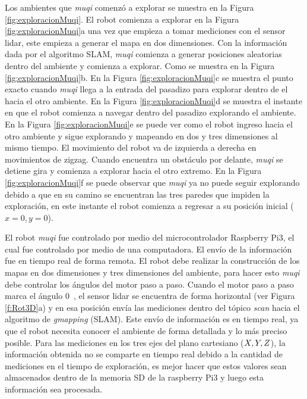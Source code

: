 Los ambientes que \textit{muqi} comenzó a explorar se muestra en la Figura 
\ref{fig:exploracionMuqi}. El robot comienza a explorar en la Figura 
\ref{fig:exploracionMuqi}a una vez que empieza a tomar mediciones con el sensor 
lidar, este empieza a generar el mapa en dos dimensiones. Con la información
dada por el algoritmo SLAM, \textit{muqi} comienza a generar posiciones aleatorias 
dentro del ambiente y comienza a explorar. Como se muestra en la Figura 
\ref{fig:exploracionMuqi}b. En la Figura \ref{fig:exploracionMuqi}c se muestra el 
punto exacto cuando \textit{muqi} llega a la entrada del pasadizo para explorar 
dentro de el hacia el otro ambiente. En la Figura \ref{fig:exploracionMuqi}d se 
muestra el instante en que el robot comienza a navegar dentro del pasadizo explorando 
el ambiente. En la Figura \ref{fig:exploracionMuqi}e se puede ver como el robot ingreso 
hacia el otro ambiente y sigue explorando y mapeando en dos y tres dimensiones al 
mismo tiempo. El movimiento del robot va de izquierda a derecha en movimientos de 
zigzag. Cuando encuentra un obstáculo por delante, \textit{muqi} se detiene gira y 
comienza a explorar hacia el otro extremo. En la Figura \ref{fig:exploracionMuqi}f 
se puede observar que \textit{muqi} ya no puede seguir explorando debido a que en 
su camino se encuentran las tres paredes que impiden la exploración, en este 
instante el robot comienza a regresar a su posición inicial ($x = 0, y = 0$).

El robot \textit{muqi} fue controlado por medio del microcontrolador Raspberry Pi3, el 
cual fue controlado por medio de una computadora. El envío de la información fue en 
tiempo real de forma remota. El robot debe realizar la construcción de los mapas en 
dos dimensiones y tres dimensiones del ambiente, para hacer esto \textit{muqi} debe 
controlar los ángulos del motor paso a paso. Cuando el motor paso a paso marca el 
ángulo 0~\grad, el sensor lidar se encuentra de forma horizontal (ver Figura \ref{f:Rot3D}a) 
y en esa posición envía las mediciones dentro del tópico \textit{scan} hacia el 
algoritmo de \textit{gmapping} (SLAM). Este envío de información es en tiempo real, ya 
que el robot necesita conocer el ambiente de forma detallada y lo más preciso posible. 
Para las mediciones en los tres ejes del plano cartesiano ($\mathnormal X, \mathnormal Y, \mathnormal Z$), 
la información obtenida no se comparte en tiempo real debido a la cantidad de mediciones 
en el tiempo de exploración, es mejor hacer que estos valores sean almacenados dentro 
de la memoria SD de la raspberry Pi3 y luego esta información sea procesada.

